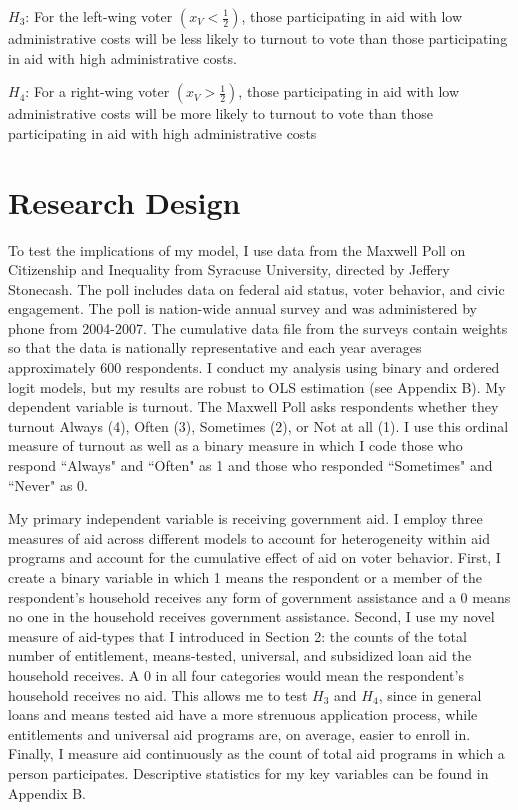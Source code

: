 \documentclass[12pt]{paper}
\begin{document}
$H_3$: For the left-wing voter $(x_V < \frac{1}{2})$, those participating in aid with low administrative costs will be less likely to turnout to vote than those participating in aid with high administrative costs.

$H_4$: For a right-wing voter $(x_V > \frac{1}{2})$, those participating in aid with low administrative costs will be more likely to turnout to vote than those participating in aid with high administrative costs

\section{Research Design}
To test the implications of my model, I use data from the Maxwell Poll on Citizenship and Inequality from Syracuse University, directed by Jeffery Stonecash. The poll includes data on federal aid status, voter behavior, and civic engagement. The poll is nation-wide annual survey and was administered by phone from 2004-2007. The cumulative data file from the surveys contain weights so that the data is nationally representative and each year averages approximately 600 respondents. I conduct my analysis using binary and ordered logit models, but my results are robust to OLS estimation (see Appendix B). My dependent variable is turnout. The Maxwell Poll asks respondents whether they turnout Always (4), Often (3), Sometimes (2), or Not at all (1). I use this ordinal measure of turnout as well as a binary measure in which I code those who respond ``Always" and ``Often" as 1 and those who responded ``Sometimes" and ``Never" as 0.

My primary independent variable is receiving government aid. I employ three measures of aid across different models to account for heterogeneity within aid programs and account for the cumulative effect of aid on voter behavior. First, I create a binary variable in which 1 means the respondent or a member of the respondent’s household receives any form of government assistance and a 0 means no one in the household receives government assistance. Second, I use my novel measure of aid-types that I introduced in Section 2: the counts of the total number of entitlement, means-tested, universal, and subsidized loan aid the household receives. A 0 in all four categories would mean the respondent’s household receives no aid. This allows me to test $H_3$ and $H_4$, since in general loans and means tested aid have a more strenuous application process, while entitlements and universal aid programs are, on average, easier to enroll in. Finally, I measure aid continuously as the count of total aid programs in which a person participates. Descriptive statistics for my key variables can be found in Appendix B.
\end{document}
